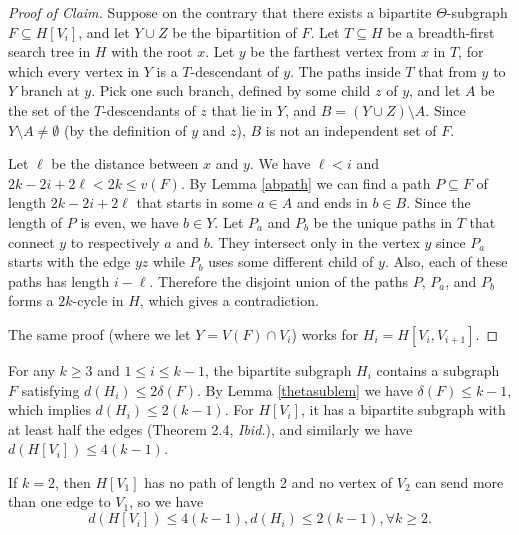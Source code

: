 \documentclass[12pt]{article}
\begin{document}
\begin{proof}[Proof of Claim]
Suppose on the contrary that there exists a bipartite $ \Theta $-subgraph $ F \subseteq H[V_i] $, and let $ Y \cup Z $ be the bipartition of $ F $. Let $ T \subseteq H $ be a breadth-first search tree in $ H $ with the root $ x $. Let $ y $ be the farthest vertex from $ x $ in $T$, for which every vertex in $Y$ is a $ T $-descendant of $ y $. The paths inside $ T $ that from $ y $ to $ Y $ branch at $ y $. Pick one such branch, defined by some child $ z $ of $ y $, and let $ A $ be the set of the $ T $-descendants of $ z $ that lie in $ Y $, and $ B = (Y \cup Z) \setminus A $. Since $ Y \setminus A \neq \emptyset $ (by the definition of $y$ and $z$), $ B $ is not an independent set of $ F $.

Let $ \ell $ be the distance between $ x $ and $ y $. We have $ \ell < i $ and $ 2k - 2i + 2\ell < 2k \leq v(F) $. By Lemma \ref{abpath} we can find a path $ P \subseteq F $ of length $ 2k - 2i + 2\ell $ that starts in some $ a \in A $ and ends in $ b \in B $. Since the length of $ P $ is even, we have $ b \in Y $. Let $ P_a $ and $ P_b $ be the unique paths in $ T $ that connect $ y $ to respectively $ a $ and $ b $. They intersect only in the vertex $ y $ since $ P_a $ starts with the edge $ yz $ while $ P_b $ uses some different child of $ y $. Also, each of these paths has length $ i - \ell $. Therefore the disjoint union of the paths $ P $, $ P_a $, and $ P_b $ forms a $ 2k $-cycle in $ H $, which gives a contradiction.

The same proof (where we let $ Y = V(F) \cap V_i $) works for $ H_i = H[V_i, V_{i+1}] $.	
\end{proof}

For any $k\geq 3$ and $1\leq i \leq k-1$, the bipartite subgraph $H_i$ contains a subgraph $F$ satisfying $d(H_i)\leq 2\delta(F)$. By Lemma \ref{thetasublem} we have $\delta(F)\leq k-1$, which implies $d(H_i)\leq 2(k-1)$. For $H[V_i]$, it has a bipartite subgraph with at least half the edges (Theorem 2.4, \textit{Ibid.}), and similarly we have $d(H[V_i])\leq 4(k-1)$.

If $ k = 2 $, then $ H[V_1] $ has no path of length 2 and no vertex of $ V_2 $ can send more than one edge to $ V_1 $, so we have 
\[
d(H[V_i])\leq 4(k-1), d(H_i)\leq 2(k-1), \forall k\geq 2. \tag{9}
\]
\end{document}
